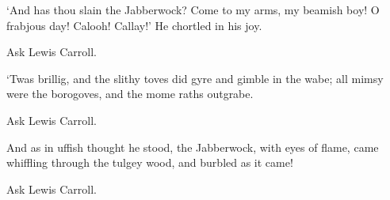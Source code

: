 \documentclass[10pt]{examdesign}
\begin{document}
\begin{shortanswer}[title={Short Answer (10 pts each)},
	rearrange=yes,resetcounter=no]
	\begin{question}
		`And has thou slain the Jabberwock? Come to my arms, my beamish boy!
		O frabjous day! Calooh! Callay!' He chortled in his joy.
		\begin{answer}
			Ask Lewis Carroll.
		\end{answer}
	\end{question}
	
	\begin{question}
		`Twas brillig, and the slithy toves did gyre and gimble in the wabe;
		all mimsy were the borogoves, and the mome raths outgrabe.
		\begin{answer}
			Ask Lewis Carroll.
		\end{answer}
	\end{question}
	
	\begin{question}
		And as in uffish thought he stood, the Jabberwock, with eyes of flame,
		came whiffling through the tulgey wood, and burbled as it came!
		\begin{answer}
			Ask Lewis Carroll.
		\end{answer}
	\end{question}
	
	
	
	
	
	
	
\end{shortanswer}
\end{document}
